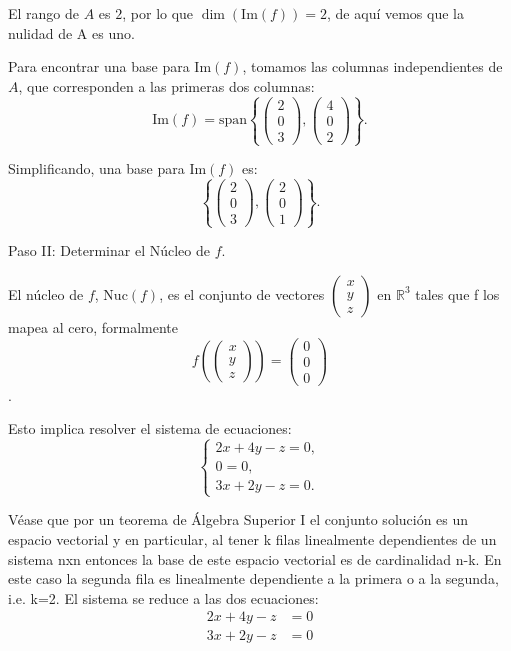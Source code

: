 \documentclass{article}
\begin{document}
El rango de \( A \) es \( 2 \), por lo que \( \dim(\text{Im}(f)) = 2 \), de aquí vemos que la nulidad de A es uno.

Para encontrar una base para \( \text{Im}(f) \), tomamos las columnas independientes de \( A \), que corresponden a las primeras dos columnas:
\[
\text{Im}(f) = \text{span} \left\{ \begin{pmatrix} 2 \\ 0 \\ 3 \end{pmatrix}, \begin{pmatrix} 4 \\ 0 \\ 2 \end{pmatrix} \right\}.
\]

Simplificando, una base para \( \text{Im}(f) \) es:
\[
\left\{ \begin{pmatrix} 2 \\ 0 \\ 3 \end{pmatrix}, \begin{pmatrix} 2 \\ 0 \\ 1 \end{pmatrix} \right\}.
\]

Paso II: Determinar el Núcleo de \( f \).

El núcleo de \( f \), \( \text{Nuc}(f) \), es el conjunto de vectores \( \begin{pmatrix} x \\ y \\ z \end{pmatrix} \) en \( \mathbb{R}^3 \) tales que f los mapea al cero, formalmente \[ f\left( \begin{pmatrix} x \\ y \\ z \end{pmatrix} \right) = \begin{pmatrix} 0 \\ 0 \\ 0 \end{pmatrix} \].

Esto implica resolver el sistema de ecuaciones:
\[
\begin{cases} 
2x + 4y - z = 0, \\ 
0 = 0, \\
3x + 2y - z = 0.
\end{cases}
\]

Véase que por un teorema de Álgebra Superior I el conjunto solución es un espacio vectorial y en particular, al tener k filas linealmente dependientes de un sistema nxn entonces la base de este espacio vectorial es de cardinalidad n-k. En este caso la segunda fila es linealmente dependiente a la primera o a la segunda, i.e. k=2. El sistema se reduce a las dos ecuaciones:
\begin{align*}
2x + 4y - z &= 0 \\
3x + 2y - z &= 0
\end{align*}
\end{document}
